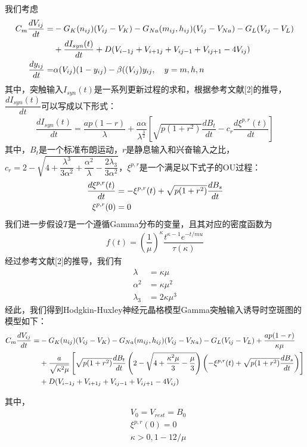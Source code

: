 \documentclass[
    bachelor,
    nofont, %
    pdflinks,
    ]{xjtuthesis}
\begin{document}
我们考虑
\begin{align}
\notag C_m \dfrac{dV_{ij}}{dt} = &- G_K(n_{ij})(V_{ij}-V_K)-G_{Na}(m_{ij},h_{ij})(V_{ij}-V_{Na}) - G_L(V_{ij}-V_L)\\
&+ \dfrac{d I_{syn}(t)}{dt} +D(V_{i-1j}+V_{i+1j}+V_{ij-1}+V_{ij+1}-4V_{ij})\\
\dfrac{dy_{ij}}{dt} = & \alpha (V_{ij})(1-y_{ij})-\beta ((V_{ij})y_{ij}, \quad y=m,h,n
\end{align}
其中，突触输入$I_{syn}(t)$是一系列更新过程的求和，根据参考文献[2]的推导，$ \dfrac{d I_{syn}(t)}{dt}$可以写成以下形式：
\begin{align}
\dfrac{d I_{syn}(t)}{dt} =  \dfrac{ap(1-r)}{\lambda} + \dfrac{a \alpha}{\lambda^{\frac{3}{2}}} [\sqrt{p(1+r^2)}\dfrac{dB_t}{dt}-c_r \dfrac{d\xi^{p,r}(t)}{dt}]
\end{align}
其中，$B_t$是一个标准布朗运动，$r$是静息输入和兴奋输入之比， $c_r=2-\sqrt{4+\dfrac{\lambda^3}{3\alpha^2}+\dfrac{\alpha^2}{\lambda}-\dfrac{2\lambda_3}{3\alpha^2}}$，$\xi^{p,r}$是一个满足以下式子的OU过程：
\begin{align}
\dfrac{d\xi^{p,r}(t)}{dt} &=  -\xi^{p,r}(t) + \sqrt{p(1+r^2)} \dfrac{dB_s}{dt}\\
\notag \xi^{p,r}(0) & =0
\end{align}
我们进一步假设$T$是一个遵循Gamma分布的变量，且其对应的密度函数为
\begin{align}
f(t)=\left(\dfrac{1}{\mu}\right)^{\kappa} \dfrac{t^{\kappa-1}e^{-t/mu}}{\tau(\kappa)}
\end{align}
经过参考文献[2]的推导，我们有
\begin{align}
\lambda &= \kappa \mu \\
\alpha^2 &= \kappa \mu^2 \\
\lambda_3&= 2 \kappa \mu^3
\end{align}
经此，我们得到Hodgkin-Huxley神经元晶格模型Gamma突触输入诱导时空斑图的模型如下：
\begin{align}
\notag C_m \dfrac{dV_{ij}}{dt} = &- G_K(n_{ij})(V_{ij}-V_K)-G_{Na}(m_{ij},h_{ij})(V_{ij}-V_{Na}) - G_L(V_{ij}-V_L)+ \dfrac{ap(1-r)}{\kappa \mu}\\
\notag &  + \dfrac{a}{\sqrt{\kappa^2 \mu}} \left[ \sqrt{p(1+r^2)} \dfrac{dB_t}{dt} \left( 2-\sqrt{4+ \dfrac{\kappa^2 \mu}{3}-\dfrac{\mu}{3}} \right) \left( -\xi^{p,r}(t) + \sqrt{p(1+r^2)} \dfrac{dB_s}{dt} \right) \right] \\
&+D(V_{i-1j}+V_{i+1j}+V_{ij-1}+V_{ij+1}-4V_{ij})
\end{align}

其中，
\begin{align*}
&V_0 = V_{rest} = B_0\\
&\xi^{p,r}(0) =  0\\
&\kappa >   {0, 1-12/ \mu}
\end{align*}
\end{document}
